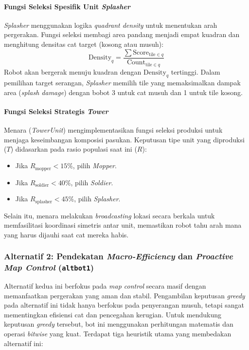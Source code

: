 \paragraph{Fungsi Seleksi Spesifik Unit \textit{Splasher}}
\textit{Splasher} menggunakan logika \textit{quadrant density} untuk menentukan arah pergerakan. Fungsi seleksi membagi area pandang menjadi empat kuadran dan menghitung densitas cat target (kosong atau musuh):
\begin{equation}
    \text{Density}_q = \frac{\sum \text{Score}_{\text{tile} \in q}}{\text{Count}_{\text{tile} \in q}}
\end{equation}
Robot akan bergerak menuju kuadran dengan $\text{Density}_q$ tertinggi. Dalam pemilihan target serangan, \textit{Splasher} memilih tile yang memaksimalkan dampak area (\textit{splash damage}) dengan bobot 3 untuk cat musuh dan 1 untuk tile kosong.

\paragraph{Fungsi Seleksi Strategis \textit{Tower}}
Menara (\textit{TowerUnit}) mengimplementasikan fungsi seleksi produksi untuk menjaga keseimbangan komposisi pasukan. Keputusan tipe unit yang diproduksi ($T$) didasarkan pada rasio populasi saat ini ($R$):
\begin{itemize}
    \item Jika $R_{\text{mopper}} < 15\%$, pilih \textit{Mopper}.
    \item Jika $R_{\text{soldier}} < 40\%$, pilih \textit{Soldier}.
    \item Jika $R_{\text{splasher}} < 45\%$, pilih \textit{Splasher}.
\end{itemize}
Selain itu, menara melakukan \textit{broadcasting} lokasi secara berkala untuk memfasilitasi koordinasi simetris antar unit, memastikan robot tahu arah mana yang harus dijauhi saat cat mereka habis.

\subsubsection{Alternatif 2: Pendekatan \textit{Macro-Efficiency} dan \textit{Proactive Map Control} (\texttt{altbot1})}

Alternatif kedua ini berfokus pada \textit{map control} secara masif dengan memanfaatkan pergerakan yang aman dan stabil. Pengambilan keputusan \textit{greedy} pada alternatif ini tidak hanya berfokus pada penyerangan musuh, tetapi sangat mementingkan efisiensi cat dan pencegahan kerugian. Untuk mendukung keputusan \textit{greedy} tersebut, bot ini menggunakan perhitungan matematis dan operasi \textit{bitwise} yang kuat. Terdapat tiga heuristik utama yang membedakan alternatif ini:

